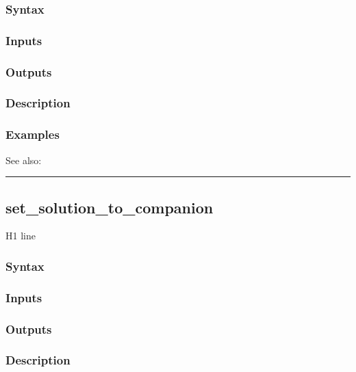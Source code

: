 \documentclass[letterpaper,10pt,english]{sphinxmanual}
\begin{document}
\subsubsection{Syntax}
\label{classes/models/@dsge/dsge:id152}

\subsubsection{Inputs}
\label{classes/models/@dsge/dsge:id153}

\subsubsection{Outputs}
\label{classes/models/@dsge/dsge:id154}

\subsubsection{Description}
\label{classes/models/@dsge/dsge:id155}

\subsubsection{Examples}
\label{classes/models/@dsge/dsge:id156}
See also:


\bigskip\hrule{}\bigskip



\subsection{set\_solution\_to\_companion}
\label{classes/models/@dsge/dsge:id157}\label{classes/models/@dsge/dsge:set-solution-to-companion}
H1 line


\subsubsection{Syntax}
\label{classes/models/@dsge/dsge:id158}

\subsubsection{Inputs}
\label{classes/models/@dsge/dsge:id159}

\subsubsection{Outputs}
\label{classes/models/@dsge/dsge:id160}

\subsubsection{Description}
\label{classes/models/@dsge/dsge:id161}
\end{document}
